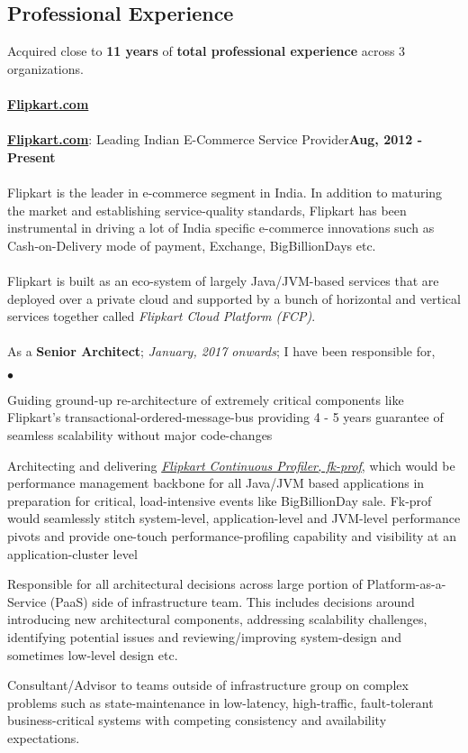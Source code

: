 \documentclass[margin,line]{res}
\newenvironment{list2}{
  \begin{list}{$\bullet$}{%
      \setlength{\itemsep}{0in}
      \setlength{\parsep}{0in} \setlength{\parskip}{0in}
      \setlength{\topsep}{0in} \setlength{\partopsep}{0in} 
      \setlength{\leftmargin}{0.2in}}}{\end{list}}
\begin{document}
\begin{resume}
\section{\sc Professional Experience}
\vspace{.4cm}
Acquired close to {\bf 11 years} of {\bf total professional experience} across 3 organizations.\\
\\
{\underline {\bf Flipkart.com}}\\
\\
\href{https://www.flipkart.com/}{\bf Flipkart.com}: Leading Indian E-Commerce Service Provider\hfill {\bf Aug, 2012 - Present}\\
\vspace{-.2cm}\\
Flipkart is the leader in e-commerce segment in India. In addition to maturing the market and establishing service-quality standards, Flipkart has been instrumental in driving a lot of India specific e-commerce innovations such as Cash-on-Delivery mode of payment, Exchange, BigBillionDays etc.\\
\\
Flipkart is built as an eco-system of largely Java/JVM-based services that are deployed over a private cloud and supported by a bunch of horizontal and vertical services together called {\em Flipkart Cloud Platform (FCP)}.\\
\\
As a {\bf Senior Architect}; {\em January, 2017 onwards}; I have been responsible for,\\
\begin{list2}
\item Guiding ground-up re-architecture of extremely critical components like Flipkart's transactional-ordered-message-bus providing 4 - 5 years guarantee of seamless scalability without major code-changes
\item Architecting and delivering \href{https://github.com/Flipkart/fk-prof}{\em Flipkart Continuous Profiler, fk-prof}, which would be performance management backbone for all Java/JVM based applications in preparation for critical, load-intensive events like BigBillionDay sale. Fk-prof would seamlessly stitch system-level, application-level and JVM-level performance pivots and provide one-touch performance-profiling capability and visibility at an application-cluster level
\item Responsible for all architectural decisions across large portion of Platform-as-a-Service (PaaS) side of infrastructure team. This includes decisions around introducing new architectural components, addressing scalability challenges, identifying potential issues and reviewing/improving system-design and sometimes low-level design etc.
\item Consultant/Advisor to teams outside of infrastructure group on complex problems such as state-maintenance in low-latency, high-traffic, fault-tolerant business-critical systems with competing consistency and availability expectations.
\end{list2}


\end{resume}
\end{document}
